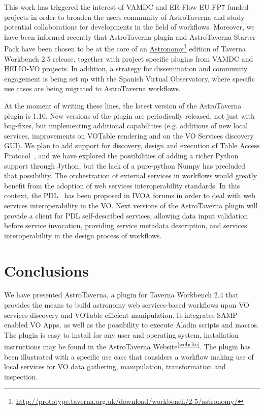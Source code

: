 \documentclass[final,authoryear,5p,times,twocolumn]{elsarticle}
\newcommand{\urlsamefont}[1]{\urlstyle{same}\url{#1}}
\newcommand{\hrefnote}[2]{\href{#1}{#2}\footnote{\urlsamefont{#1}}}
\begin{document}
This work has triggered the interest of VAMDC and ER-Flow EU FP7 funded projects in order to broaden the users community of AstroTaverna and study potential collaborations for developments in the field of workflows. Moreover, we have been informed recently that AstroTaverna plugin and AstroTaverna Starter Pack have been chosen to be at the core of an \hrefnote{http://prototype.taverna.org.uk/download/workbench/2-5/astronomy/}{Astronomy} edition of Taverna Workbench 2.5 release, together with project specific plugins from VAMDC and HELIO-VO projects. In addition, a strategy for dissemination and community engagement is being set up with the Spanish Virtual Observatory, where specific use cases are being migrated to AstroTaverna workflows. 

At the moment of writing these lines, the latest version of the AstroTaverna plugin is 1.10. New versions of the plugin are periodically released, not just with bug-fixes, but implementing additional capabilities (e.g. additions of new local services, improvements on VOTable rendering and on the VO Services discovery GUI). We plan to add support for discovery, design and execution of Table Access Protocol~\citep[TAP;][]{Dowler2010}, and we have explored the possibilities of adding a richer Python support through Jython, but the lack of a pure-python Numpy has precluded that possibility. The orchestration of external services in workflows would greatly benefit from the adoption of web services interoperability standards. In this context, the PDL~\citep[Parameter Description Language;][]{Zwolf2013} has been proposed in IVOA forums in order to deal with web services interoperability in the VO. Next versions of the AstroTaverna plugin will provide a client for PDL self-described services, allowing data input validation before service invocation, providing service metadata description, and services interoperability in the design process of workflows. 

\section{Conclusions}
\label{Conclusions}

We have presented AstroTaverna, a plugin for Taverna Workbench 2.4 that provides the means to build astronomy web services-based workflows upon VO services discovery and VOTable efficient manipulation. It integrates SAMP-enabled VO Apps, as well as the possibility to execute Aladin scripts and macros. The plugin is easy to install for any user and operating system, installation instructions may be found in the
AstroTaverna Website\textsuperscript{\ref{website}}. The plugin has been illustrated with a specific use case that considers a workflow making use of local services for VO data gathering, manipulation, transformation and inspection.
\end{document}
